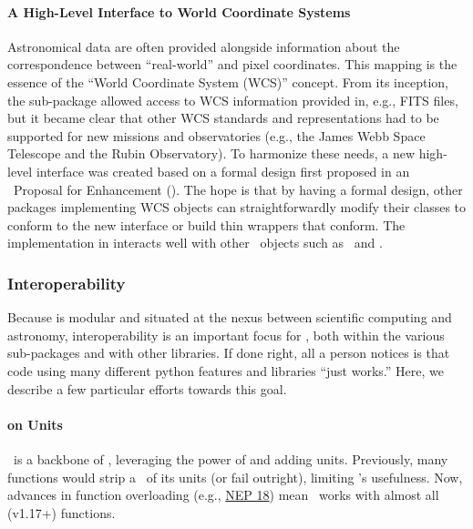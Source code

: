 \documentclass[modern]{aastex631}
\begin{document}
\paragraph{A High-Level Interface to World Coordinate Systems}
Astronomical data are often provided alongside information about the
correspondence between ``real-world'' and pixel coordinates. This mapping is the
essence of the ``World Coordinate System (WCS)'' concept. From its inception,
the  sub-package allowed access to WCS information provided
in, e.g., FITS files, but it became clear that other WCS standards and
representations had to be supported for new missions and observatories (e.g.,
the James Webb Space Telescope and the Rubin Observatory). To harmonize these
needs, a new high-level interface was created based on a formal design first
proposed in an \astropy\ Proposal for Enhancement (). The hope is
that by having a formal design, other packages implementing WCS objects can
straightforwardly modify their classes to conform to the new interface or build
thin wrappers that conform. The implementation in  interacts
well with other \astropypkg\ objects such as \astropySkyCoord\ and \astropyTime.

\subsubsection{Interoperability} \label{sec:core-features-interoperability}

Because \astropy is modular and situated at the nexus between scientific
computing and astronomy, interoperability is an important focus for \astropy,
both within the various \astropypkg sub-packages and with other \python
libraries. If done right, all a person notices is that code using many different
python features and libraries ``just works.'' Here, we describe a few particular
efforts towards this goal.

\paragraph{ on Units}

\astropyQuantity\ is a backbone of \astropy, leveraging the power of
 and adding units. Previously, many  functions
would strip a \astropyQuantity\ of its units (or fail outright), limiting
\astropyQuantity's usefulness. Now, advances in  function
overloading (e.g.,
\href{https://numpy.org/neps/nep-0018-array-function-protocol.html}{NEP 18})
mean \astropyQuantity\ works with almost all  (v1.17+)
functions.
\end{document}
